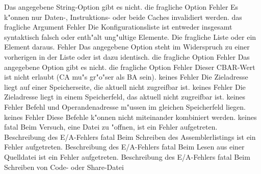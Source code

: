 \documentclass[12pt,a4paper,twoside]{report}
\begin{document}
\begin{description}
               {Das angegebene String-Option gibt es nicht.}
               {die fragliche Option}
               {Fehler}
               {Es k"onnen nur Daten-, Instruktions- oder beide Caches invalidiert werden.}
               {das fragliche Argument}
               {Fehler}
               {Die Konfigurationsliste ist entweder insgesamt syntaktisch falsch oder 
                enth"alt ung"ultige Elemente.}
               {Die fragliche Liste oder ein Element daraus.}
               {Fehler}
               {Das angegebene Option steht im Widerspruch zu einer vorherigen in der Liste oder ist dazu identisch.}
               {die fragliche Option}
               {Fehler}
               {Das angegebene Option gibt es nicht.}
               {die fragliche Option}
               {Fehler}
               {Dieser CBAR-Wert ist nicht erlaubt (CA mu"s gr"o"ser als BA sein).}
               {keines}
               {Fehler}
               {Die Zieladresse liegt auf einer Speicherseite, die aktuell nicht
                zugreifbar ist.}
               {keines}
               {Fehler}
               {Die Zieladresse liegt in einem Speicherfeld, das aktuell nicht
                zugreifbar ist.}
               {keines}
               {Fehler}
               {Befehl und Operandenadresse m"ussen
                im gleichen Speicherfeld liegen.}
               {keines}
               {Fehler}
               {Diese Befehle k"onnen nicht miteinander kombiniert werden.}
               {keines}
               {fatal}
               {Beim Versuch, eine Datei zu "offnen, ist ein
                Fehler aufgetreten.}
               {Beschreibung des E/A-Fehlers}
               {fatal}
               {Beim Schreiben des Assemblerlistings ist ein
                Fehler aufgetreten.}
               {Beschreibung des E/A-Fehlers}
               {fatal}
               {Beim Lesen aus einer Quelldatei ist ein
                Fehler aufgetreten.}
               {Beschreibung des E/A-Fehlers}
               {fatal}
               {Beim Schreiben von Code- oder Share-Datei
}
\end{description}
\end{document}
